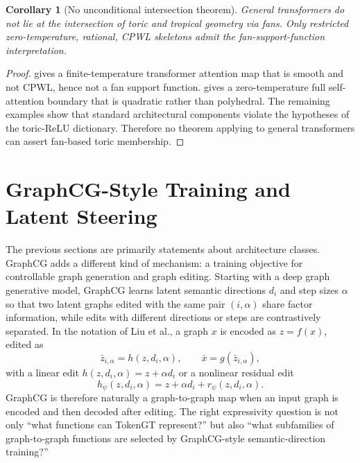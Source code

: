 \documentclass[11pt]{article}
\newtheorem{corollary}[theorem]{Corollary}
\begin{document}
\begin{corollary}[No unconditional intersection theorem]
\label{cor:no-intersection}
General transformers do not lie at the intersection of toric and tropical geometry via fans.  Only restricted zero-temperature, rational, CPWL skeletons admit the fan-support-function interpretation.
\end{corollary}

\begin{proof}
 gives a finite-temperature transformer attention map that is smooth and not CPWL, hence not a fan support function.   gives a zero-temperature full self-attention boundary that is quadratic rather than polyhedral.  The remaining examples show that standard architectural components violate the hypotheses of the toric-ReLU dictionary.  Therefore no theorem applying to general transformers can assert fan-based toric membership.
\end{proof}

\section{GraphCG-Style Training and Latent Steering}
\label{sec:graphcg-training}

The previous sections are primarily statements about architecture classes.  GraphCG \cite{liu2024graphcg} adds a different kind of mechanism: a training objective for controllable graph generation and graph editing.  Starting with a deep graph generative model, GraphCG learns latent semantic directions $d_i$ and step sizes $\alpha$ so that two latent graphs edited with the same pair $(i,\alpha)$ share factor information, while edits with different directions or steps are contrastively separated.  In the notation of Liu et al., a graph $x$ is encoded as $z=f(x)$, edited as
\[
  \bar z_{i,\alpha}=h(z,d_i,\alpha),
  \qquad
  \bar x=g(\bar z_{i,\alpha}),
\]
with a linear edit $h(z,d_i,\alpha)=z+\alpha d_i$ or a nonlinear residual edit
\[
  h_\psi(z,d_i,\alpha)=z+\alpha d_i+r_\psi(z,d_i,\alpha).
\]
GraphCG is therefore naturally a graph-to-graph map when an input graph is encoded and then decoded after editing.  The right expressivity question is not only ``what functions can TokenGT represent?'' but also ``what subfamilies of graph-to-graph functions are selected by GraphCG-style semantic-direction training?''
\end{document}
